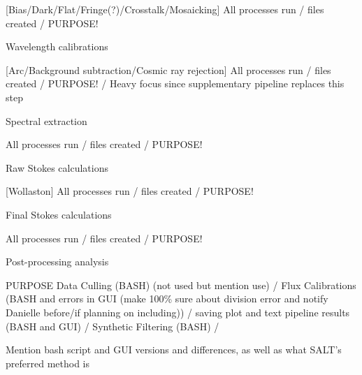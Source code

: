 [Bias/Dark/Flat/Fringe(?)/Crosstalk/Mosaicking]
All processes run / files created / PURPOSE!

\noindent Wavelength calibrations

[Arc/Background subtraction/Cosmic ray rejection]
All processes run / files created / PURPOSE! / Heavy focus since supplementary pipeline replaces this step

\noindent Spectral extraction

All processes run / files created / PURPOSE!

\noindent Raw Stokes calculations

[Wollaston]
All processes run / files created / PURPOSE!

\noindent Final Stokes calculations

All processes run / files created / PURPOSE!

\noindent Post-processing analysis %

PURPOSE
Data Culling (BASH) (not used but mention use) / 
Flux Calibrations (BASH and errors in GUI (make 100\% sure about division error and notify Danielle before/if planning on including)) / 
saving plot and text pipeline results (BASH and GUI) / 
Synthetic Filtering (BASH) / 

Mention bash script and GUI versions and differences, as well as what SALT's preferred method is
